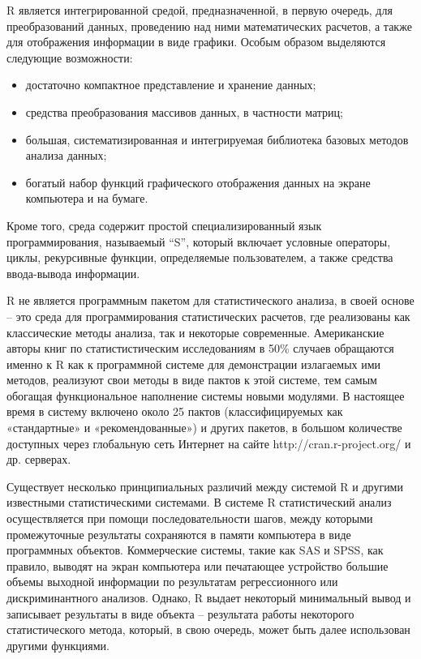 \documentclass[12pt, openany, twoside]{book} %
\begin{document}
R является интегрированной средой, предназначенной, в первую очередь, для преобразований данных, проведению над ними математических расчетов, а также для отображения информации в виде графики. Особым образом выделяются следующие возможности:
\begin{itemize}
\item достаточно компактное представление и хранение данных;
\item средства преобразования массивов данных, в частности матриц;
\item большая, систематизированная и интегрируемая библиотека базовых методов анализа данных;
\item богатый набор функций графического отображения данных на экране компьютера и на бумаге.
\end{itemize}
Кроме того, среда содержит простой специализированный язык программирования, называемый ``S'', который включает условные операторы, циклы, рекурсивные функции, определяемые пользователем, а также средства ввода-вывода информации. 

R не является программным пакетом для статистического анализа, в своей основе – это среда для программирования статистических расчетов, где реализованы как классические методы анализа, так и некоторые современные. Американские авторы книг по статистистическим исследованиям в 50\% случаев обращаются именно к R как к программной системе для демонстрации излагаемых ими методов, реализуют свои методы в виде пактов к этой системе, тем самым обогащая функциональное наполнение системы новыми модулями. В настоящее время в систему  включено около 25 пактов (классифицируемых как «стандартные» и «рекомендованные») и других пакетов, в большом количестве доступных через глобальную сеть Интернет на сайте http://cran.r-project.org/ и др. серверах.

Существует несколько принципиальных различий между системой R и другими известными статистическими системами. В системе R статистический анализ осуществляется при помощи последовательности шагов, между которыми промежуточные результаты сохраняются в памяти компьютера в виде программных объектов. Коммерческие системы, такие как SAS и SPSS, как правило, выводят на экран компьютера или печатающее устройство большие объемы выходной информации по результатам регрессионного или дискриминантного анализов. Однако, R выдает некоторый минимальный вывод и записывает результаты в виде объекта – результата работы некоторого статистического метода, который, в свою очередь, может быть далее использован другими функциями.
\end{document}
